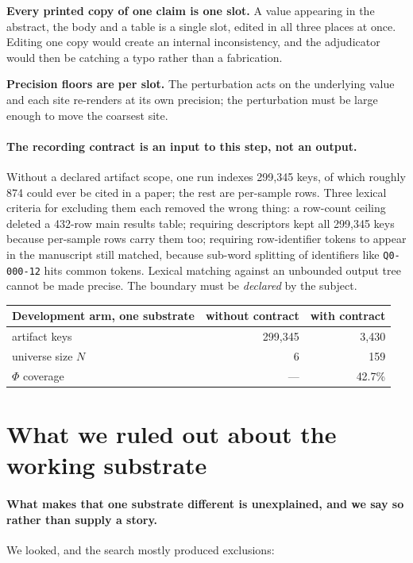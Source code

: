 \documentclass[10pt]{article}
\newcommand{\RM}[1]{{#1}}
\begin{document}
\textbf{Every printed copy of one claim is one slot.} A value appearing in the
abstract, the body and a table is a single slot, edited in all three places at
once. Editing one copy would create an internal inconsistency, and the
adjudicator would then be catching a typo rather than a fabrication.

\textbf{Precision floors are per slot.} The perturbation acts on the underlying
value and each site re-renders at its own precision; the perturbation must be
large enough to move the coarsest site.

\paragraph{The recording contract is an input to this step, not an output.}
Without a declared artifact scope, one run indexes \RM{299{,}345} keys, of
which roughly \RM{874} could ever be cited in a paper; the rest are per-sample
rows. Three lexical criteria for excluding them each removed the wrong thing:
a row-count ceiling deleted a \RM{432}-row main results table; requiring
descriptors kept all \RM{299{,}345} keys because per-sample rows carry them
too; requiring row-identifier tokens to appear in the manuscript still matched,
because sub-word splitting of identifiers like \texttt{Q0-000-12} hits common
tokens. Lexical matching against an unbounded output tree cannot be made
precise. The boundary must be \emph{declared} by the subject.

\begin{center}
\small
\begin{tabular}{@{}lrr@{}}
\toprule
Development arm, one substrate & without contract & with contract \\
\midrule
artifact keys & \RM{299{,}345} & \RM{3{,}430} \\
universe size $N$ & \RM{6} & \RM{159} \\
$\Phi$ coverage & --- & \RM{42.7\%} \\
\bottomrule
\end{tabular}
\end{center}



\section{What we ruled out about the working substrate}
\label{app:ruledout}

\paragraph{What makes that one substrate different is unexplained, and we say so
rather than supply a story.} We looked, and the search mostly produced
exclusions:
\end{document}
